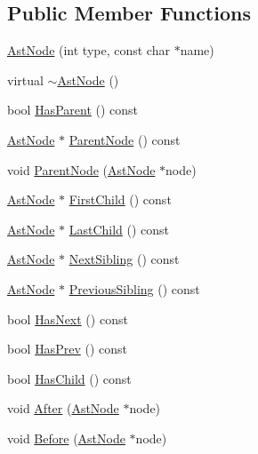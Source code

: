 \subsection*{Public Member Functions}
\begin{DoxyCompactItemize}
\item 
\hyperlink{classmocha_1_1_ast_node_a5cb29b437d039f99b9564a6f57ffdd00}{AstNode} (int type, const char $\ast$name)
\item 
virtual \hyperlink{classmocha_1_1_ast_node_a9b98ab2e19ffa04db7764aee0115a3e6}{$\sim$AstNode} ()
\item 
bool \hyperlink{classmocha_1_1_ast_node_a152ba82ce47f57518affcdcfab32d715}{HasParent} () const 
\item 
\hyperlink{classmocha_1_1_ast_node}{AstNode} $\ast$ \hyperlink{classmocha_1_1_ast_node_a508b893ad27be7285d6cf96737a2e549}{ParentNode} () const 
\item 
void \hyperlink{classmocha_1_1_ast_node_abc6f6e9b96a7288c623d47a4e81c5e5c}{ParentNode} (\hyperlink{classmocha_1_1_ast_node}{AstNode} $\ast$node)
\item 
\hyperlink{classmocha_1_1_ast_node}{AstNode} $\ast$ \hyperlink{classmocha_1_1_ast_node_a65c6f1546ebb657cbfb265f372c183cd}{FirstChild} () const 
\item 
\hyperlink{classmocha_1_1_ast_node}{AstNode} $\ast$ \hyperlink{classmocha_1_1_ast_node_ad1a001a8c53bf5f73d4e81096f0f41be}{LastChild} () const 
\item 
\hyperlink{classmocha_1_1_ast_node}{AstNode} $\ast$ \hyperlink{classmocha_1_1_ast_node_ad568cfbbb250d9f799b3f12643e7a351}{NextSibling} () const 
\item 
\hyperlink{classmocha_1_1_ast_node}{AstNode} $\ast$ \hyperlink{classmocha_1_1_ast_node_a5f924748e1521b0ff97a7a19d38d5285}{PreviousSibling} () const 
\item 
bool \hyperlink{classmocha_1_1_ast_node_a761c6fb24c7edb954db96553b297149d}{HasNext} () const 
\item 
bool \hyperlink{classmocha_1_1_ast_node_a61e3973ce971d0fe34bf0845244a3230}{HasPrev} () const 
\item 
bool \hyperlink{classmocha_1_1_ast_node_a28e18f36cfc63123b30abc3064a3887f}{HasChild} () const 
\item 
void \hyperlink{classmocha_1_1_ast_node_ac7dc9d4a51723735fb274092808a08e2}{After} (\hyperlink{classmocha_1_1_ast_node}{AstNode} $\ast$node)
\item 
void \hyperlink{classmocha_1_1_ast_node_a24817ffa5ca8bcbc88637e77232bbd07}{Before} (\hyperlink{classmocha_1_1_ast_node}{AstNode} $\ast$node)

\end{DoxyCompactItemize}
